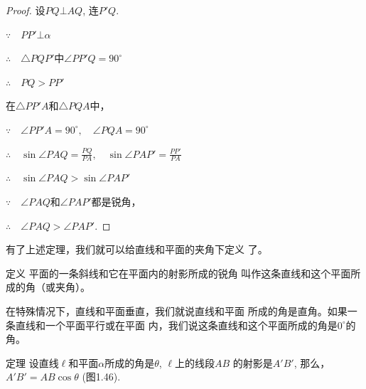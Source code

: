 \begin{proof}
  设$PQ\bot AQ$, 连$P'Q$.

  $\because\quad PP'\bot\alpha$

$\therefore\quad \triangle PQP'$中$\angle PP'Q=90^{\circ}$

$\therefore\quad PQ>PP'$

在$\triangle PP'A$和$\triangle PQA$中，

$\because\quad \angle PP'A=90^{\circ},\quad \angle PQA=90^{\circ}$

$\therefore\quad \sin\angle PAQ=\frac{PQ}{PA},\quad \sin\angle PAP'=\frac{PP'}{PA}$

$\therefore\quad \sin\angle  PAQ>\sin\angle PAP'$

$\because\quad \angle PAQ$和$\angle PAP'$都是锐角，

$\therefore\quad \angle PAQ>\angle PAP'$.
\end{proof}

有了上述定理，我们就可以给直线和平面的夹角下定义
了。


\begin{blk}
  {定义} 平面的一条斜线和它在平面内的射影所成的锐角
叫作这条直线和这个平面所成的角（或夹角）。
\end{blk}

在特殊情况下，直线和平面垂直，我们就说直线和平面
所成的角是直角。如果一条直线和一个平面平行或在平面
内，我们说这条直线和这个平面所成的角是$0^{\circ}$的角。


\begin{blk}
  {定理} 设直线$\ell$和平面$\alpha$所成的角是$\theta$, $\ell$上的线段$AB$
的射影是$A'B'$, 那么，
$A'B'=AB\cos\theta$ (图1.46).
\end{blk}


\begin{figure}[htp]
  \centering
{}
  \caption{}
\end{figure}



